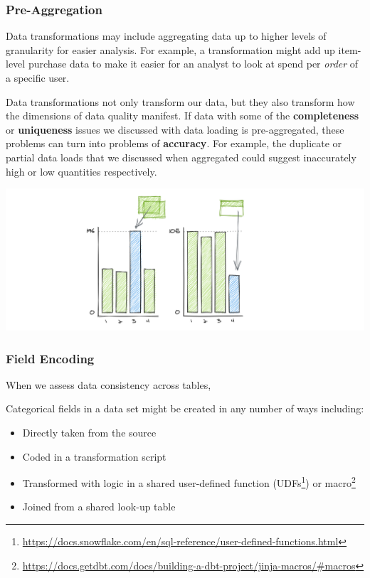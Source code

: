 \documentclass[
]{krantz}
\providecommand{\tightlist}{%
  \setlength{\itemsep}{0pt}\setlength{\parskip}{0pt}}
\renewcommand{\href}[2]{#2\footnote{\url{#1}}}
\begin{document}
\hypertarget{pre-aggregation}{%
\subsubsection{Pre-Aggregation}\label{pre-aggregation}}

Data transformations may include aggregating data up to higher levels of granularity for easier analysis. For example, a transformation might add up item-level purchase data to make it easier for an analyst to look at spend per \emph{order} of a specific user.

Data transformations not only transform our data, but they also transform how the dimensions of data quality manifest. If data with some of the \textbf{completeness} or \textbf{uniqueness} issues we discussed with data loading is pre-aggregated, these problems can turn into problems of \textbf{accuracy}. For example, the duplicate or partial data loads that we discussed when aggregated could suggest inaccurately high or low quantities respectively.

\begin{center}\includegraphics[width=0.9\linewidth]{figures/data-dall/completeness-accuracy} \end{center}

\hypertarget{field-encoding}{%
\subsubsection{Field Encoding}\label{field-encoding}}

When we assess data consistency across tables,

Categorical fields in a data set might be created in any number of ways including:

\begin{itemize}
\tightlist
\item
  Directly taken from the source
\item
  Coded in a transformation script
\item
  Transformed with logic in a shared user-defined function (\href{https://docs.snowflake.com/en/sql-reference/user-defined-functions.html}{UDFs}) or \href{https://docs.getdbt.com/docs/building-a-dbt-project/jinja-macros/\#macros}{macro}
\item
  Joined from a shared look-up table
\end{itemize}
\end{document}
